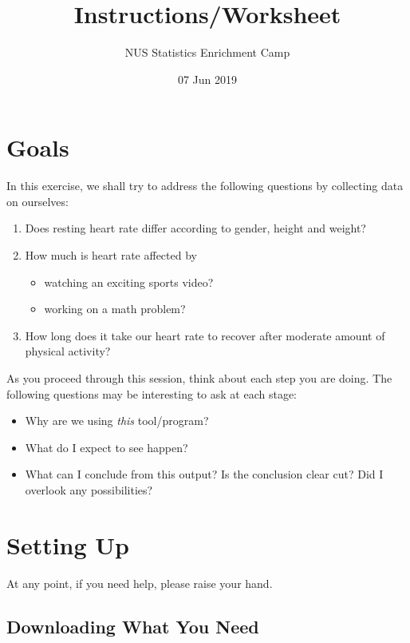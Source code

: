 \documentclass[11pt]{article}
\title{Instructions/Worksheet}
\author{NUS Statistics Enrichment Camp}
\date{07 Jun 2019}
\providecommand{\tightlist}{%
  \setlength{\itemsep}{0pt}\setlength{\parskip}{0pt}}
\begin{document}
\maketitle

\hypertarget{goals}{%
\section{Goals}\label{goals}}

In this exercise, we shall try to address the following questions by
collecting data on ourselves:

\begin{enumerate}
\def\labelenumi{\arabic{enumi}.}
\tightlist
\item
  Does resting heart rate differ according to gender, height and weight?
\item
  How much is heart rate affected by

  \begin{itemize}
  \tightlist
  \item
    watching an exciting sports video?
  \item
    working on a math problem?
  \end{itemize}
\item
  How long does it take our heart rate to recover after moderate amount
  of physical activity?
\end{enumerate}

As you proceed through this session, think about each step you are
doing. The following questions may be interesting to ask at each stage:

\begin{itemize}
\tightlist
\item
  Why are we using \emph{this} tool/program?
\item
  What do I expect to see happen?
\item
  What can I conclude from this output? Is the conclusion clear cut? Did
  I overlook any possibilities?
\end{itemize}

\hypertarget{setting-up}{%
\section{Setting Up}\label{setting-up}}

At any point, if you need help, please raise your hand.

\hypertarget{downloading-what-you-need}{%
\subsection{Downloading What You Need}\label{downloading-what-you-need}}
\end{document}
